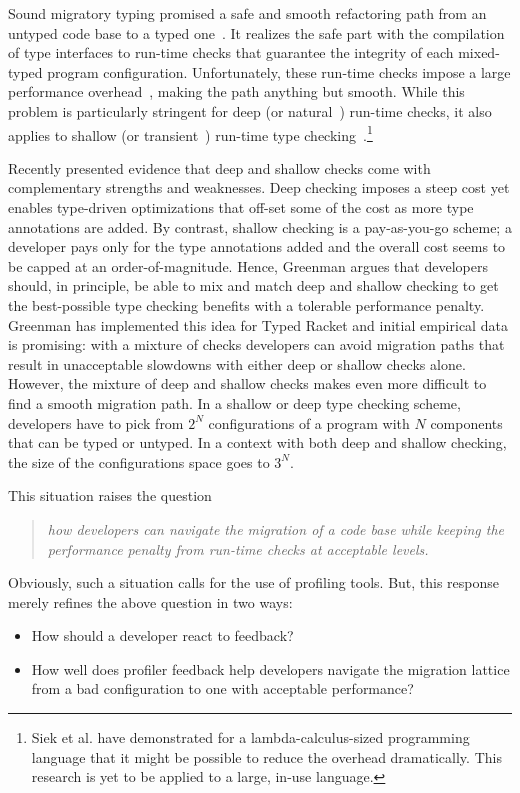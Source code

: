 
Sound migratory typing promised a safe and smooth refactoring path from an
untyped code base to a typed one~\cite{tf-dls-2006, tfffgksst-snapl-2017}. It
realizes the safe part with the compilation of type interfaces to run-time
checks that guarantee the integrity of each mixed-typed program configuration.
Unfortunately, these run-time checks impose a large performance
overhead~\cite{gtnffvf-jfp-2019}, making the path anything but smooth. While
this problem is particularly stringent for deep (or natural~\cite{tf-dls-2006,
tf-popl-2008, st-sfp-2006}) run-time checks, it also applies to shallow (or
transient~\cite{vss-popl-2017,vksb-dls-2014,v-thesis-2019}) run-time type
checking~\cite{gm-pepm-2018}.\footnote{Siek et al. have demonstrated for a
lambda-calculus-sized programming language that it might be possible to reduce
the overhead dramatically. This research is yet to be applied to a large, in-use
language.}

Recently \citet{g-thesis-2020,g-deep-shallow} presented evidence that deep and
shallow checks come with complementary strengths and weaknesses. Deep checking
imposes a steep cost yet enables type-driven optimizations that off-set some of
the cost as more type annotations are added. By contrast, shallow checking is a
pay-as-you-go scheme; a developer pays only for the type annotations added and
the overall cost seems to be capped at an order-of-magnitude. Hence, Greenman
argues that developers should, in principle, be able to mix and match deep and
shallow checking to get the best-possible type checking benefits with a
tolerable performance penalty.  Greenman has implemented this idea for Typed
Racket and initial empirical data is promising: with a mixture of checks
developers can avoid migration paths that result in unacceptable slowdowns with
either deep or shallow checks alone.  However, the mixture of deep and shallow
checks makes even more difficult to find a smooth migration path. In a shallow
or deep type checking scheme, developers have to pick from $2^N$ configurations
of a program with $N$ components that can be typed or untyped. In a context with
both deep and shallow checking, the size of the configurations space goes to
$3^N$.

This situation raises the question 
\begin{quote} \em
 how developers can navigate the migration of a code base while keeping the
 performance penalty from run-time checks at acceptable levels.
\end{quote}  
Obviously, such a situation calls for the use of profiling tools. But, this
response merely refines the above question in two ways: 
\begin{itemize} \em

\item How should a developer react to feedback?

\item How well does profiler feedback help developers navigate the migration
lattice from a bad configuration to one with acceptable performance?

\end{itemize}   

